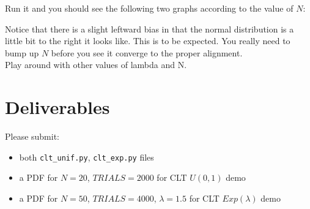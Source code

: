 \begin{fullwidth}
\step Run it and you should see the following two graphs according to the value of $N$:

\noindent {} 

Notice that there is a slight leftward bias in that the normal distribution is a little bit to the right it looks like. This is to be expected. You really need to bump up $N$ before you see it converge to the proper alignment.\\

\step Play around with other values of lambda and N.

\section{Deliverables}

Please submit:

\begin{itemize}
\item both {\tt clt\_unif.py}, {\tt clt\_exp.py} files
\item a PDF for $N=20$, $TRIALS=2000$ for CLT $U(0,1)$ demo
\item a PDF for $N=50$, $TRIALS=4000$, $\lambda=1.5$ for CLT $Exp(\lambda)$ demo
\end{itemize}

\end{fullwidth}
